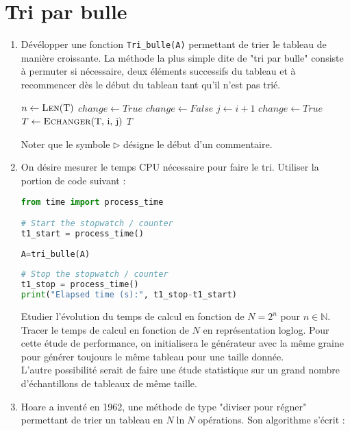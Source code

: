 \documentclass[a4paper, 12pt]{article}
\begin{document}
\section{Tri par bulle}
\begin{enumerate} 
\item Dévélopper une fonction {\tt Tri\_bulle(A)} permettant de trier le tableau de manière croissante.
La méthode la plus simple dite de "tri par bulle" consiste à permuter si nécessaire, deux éléments successifs
du tableau et à recommencer dès le début du tableau tant qu'il n'est pas trié.

\begin{algorithmic}[1]
   \begin{multicols}{2}
\State $n \gets \Call{Len}{$T$}$
\State $change \gets True$
   \State $change \gets False$ 
   \State $j \gets i+1$
           \State $change \gets True$ 
           \State $T \gets \Call{Echanger}{$T, i, j$} $ 
    \EndIf
    \EndFor
\EndWhile
    \State \Return $T$
\EndFunction
\end{multicols}
\end{algorithmic}
   Noter que le symbole $\rhd$ désigne le début d'un commentaire.
    
\item On désire mesurer le temps CPU nécessaire pour faire le tri. Utiliser la portion de code suivant :
\begin{lstlisting}[language=python]
from time import process_time

# Start the stopwatch / counter 
t1_start = process_time() 
   
A=tri_bulle(A)
  
# Stop the stopwatch / counter
t1_stop = process_time()
print("Elapsed time (s):", t1_stop-t1_start) 
\end{lstlisting}

Etudier l'évolution du temps de calcul en fonction de $N = 2^n$ pour $n \in \mathbb{N}$.
Tracer le temps de calcul en fonction de $N$ en représentation loglog.
Pour cette étude  de performance, on initialisera le générateur avec la même graine pour générer
toujours le même tableau pour une taille donnée. \\L'autre possibilité serait de faire une étude
statistique sur un grand nombre d'échantillons de tableaux de même taille.

 
\item  Hoare a inventé en 1962, une méthode de type "diviser pour régner"  permettant de trier un
tableau en $N \ln N$ opérations. 
Son algorithme s'écrit :


\end{enumerate}
\end{document}
